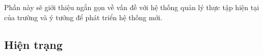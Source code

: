 \documentclass[./../main.tex]{subfiles}
\begin{document}






Phần này sẽ giới thiệu ngắn gọn về vấn đề với hệ thống quản lý thực tập
hiện tại của trường và ý tưởng để phát triển hệ thống mới.

\subsection{Hiện trạng}
\end{document}
